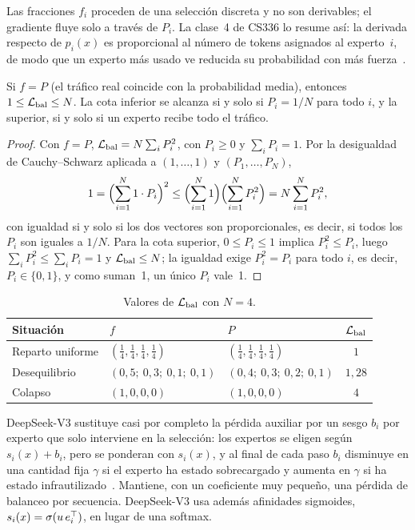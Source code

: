Las fracciones $f_i$ proceden de una selección discreta y no son derivables; el gradiente fluye solo a través de $P_i$. La clase~4 de CS336 lo resume así: la derivada respecto de $p_i(x)$ es proporcional al número de tokens asignados al experto~$i$, de modo que un experto más usado ve reducida su probabilidad con más fuerza~\cite{cs336}.

\begin{teorema}\label{teo:bal}
Si $f=P$ (el tráfico real coincide con la probabilidad media), entonces $1\le\mathcal{L}_{\mathrm{bal}}\le N$. La cota inferior se alcanza si y solo si $P_i=1/N$ para todo $i$, y la superior, si y solo si un experto recibe todo el tráfico.
\end{teorema}

\begin{proof}
Con $f=P$, $\mathcal{L}_{\mathrm{bal}}=N\sum_iP_i^{2}$, con $P_i\ge 0$ y $\sum_iP_i=1$. Por la desigualdad de Cauchy--Schwarz aplicada a $(1,\dots,1)$ y $(P_1,\dots,P_N)$,
\[
1=\Bigl(\sum_{i=1}^{N}1\cdot P_i\Bigr)^{2}\le\Bigl(\sum_{i=1}^{N}1\Bigr)\Bigl(\sum_{i=1}^{N}P_i^{2}\Bigr)=N\sum_{i=1}^{N}P_i^{2},
\]
con igualdad si y solo si los dos vectores son proporcionales, es decir, si todos los $P_i$ son iguales a $1/N$. Para la cota superior, $0\le P_i\le 1$ implica $P_i^{2}\le P_i$, luego $\sum_iP_i^{2}\le\sum_iP_i=1$ y $\mathcal{L}_{\mathrm{bal}}\le N$; la igualdad exige $P_i^{2}=P_i$ para todo $i$, es decir, $P_i\in\{0,1\}$, y como suman~1, un único $P_i$ vale~1.
\end{proof}

\begin{table}[ht]
\centering\small
\caption{Valores de $\mathcal{L}_{\mathrm{bal}}$ con $N=4$.}\label{tab:bal}
\begin{tabular}{@{}lllc@{}}
\toprule
Situación & $f$ & $P$ & $\mathcal{L}_{\mathrm{bal}}$ \\
\midrule
Reparto uniforme & $(\frac14,\frac14,\frac14,\frac14)$ & $(\frac14,\frac14,\frac14,\frac14)$ & $1$ \\
Desequilibrio & $(0{,}5;\ 0{,}3;\ 0{,}1;\ 0{,}1)$ & $(0{,}4;\ 0{,}3;\ 0{,}2;\ 0{,}1)$ & $1{,}28$ \\
Colapso & $(1,0,0,0)$ & $(1,0,0,0)$ & $4$ \\
\bottomrule
\end{tabular}
\end{table}

\begin{observacion}
DeepSeek-V3 sustituye casi por completo la pérdida auxiliar por un sesgo $b_i$ por experto que solo interviene en la selección: los expertos se eligen según $s_i(x)+b_i$, pero se ponderan con $s_i(x)$, y al final de cada paso $b_i$ disminuye en una cantidad fija $\gamma$ si el experto ha estado sobrecargado y aumenta en $\gamma$ si ha estado infrautilizado~\cite[§2.1.2]{deepseekv3}. Mantiene, con un coeficiente muy pequeño, una pérdida de balanceo por secuencia. DeepSeek-V3 usa además afinidades sigmoides, $s_i(x)=\sigma(u\,e_i^{\top})$, en lugar de una softmax.
\end{observacion}

